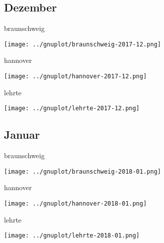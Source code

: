 \documentclass[aspectratio=169]{beamer} %
\begin{document}
\subsection{Dezember}
\begin{frame}{braunschweig}
  \begin{center}
    \texttt{[image: ../gnuplot/braunschweig-2017-12.png]}
  \end{center}
\end{frame}
\begin{frame}{hannover}
  \begin{center}
    \texttt{[image: ../gnuplot/hannover-2017-12.png]}
  \end{center}
\end{frame}
\begin{frame}{lehrte}
  \begin{center}
    \texttt{[image: ../gnuplot/lehrte-2017-12.png]}
  \end{center}
\end{frame}

\subsection{Januar}
\begin{frame}{braunschweig}
  \begin{center}
    \texttt{[image: ../gnuplot/braunschweig-2018-01.png]}
  \end{center}
\end{frame}
\begin{frame}{hannover}
  \begin{center}
    \texttt{[image: ../gnuplot/hannover-2018-01.png]}
  \end{center}
\end{frame}
\begin{frame}{lehrte}
  \begin{center}
    \texttt{[image: ../gnuplot/lehrte-2018-01.png]}
  \end{center}
\end{frame}
\end{document}
